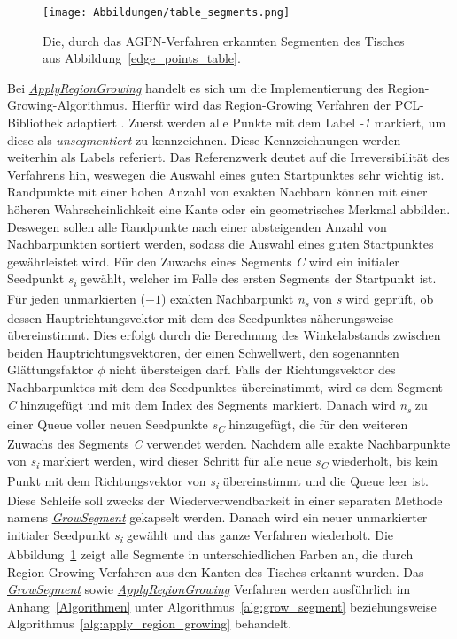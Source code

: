 \begin{figure}[t]
	\texttt{[image: Abbildungen/table\_segments.png]}
	\centering
	\caption[Segmente eines Tisches]{Die, durch das AGPN-Verfahren erkannten Segmenten des Tisches aus Abbildung~\ref{edge_points_table}.}
	\label{segments_table}
\end{figure}

Bei \textit{\hyperref[alg:apply_region_growing]{ApplyRegionGrowing}} handelt es sich um die Implementierung des Region-Growing-Algorithmus. Hierfür wird das Region-Growing Verfahren der PCL-Bibliothek adaptiert \autocite{rusu_3d_2011}. Zuerst werden alle Punkte mit dem Label \textit{-1} markiert, um diese als \textit{unsegmentiert} zu kennzeichnen. Diese Kennzeichnungen werden weiterhin als Labels referiert. Das Referenzwerk deutet auf die Irreversibilität des Verfahrens hin, weswegen die Auswahl eines guten Startpunktes sehr wichtig ist. Randpunkte mit einer hohen Anzahl von exakten Nachbarn können mit einer höheren Wahrscheinlichkeit eine Kante oder ein geometrisches Merkmal abbilden. Deswegen sollen alle Randpunkte nach einer absteigenden Anzahl von Nachbarpunkten sortiert werden, sodass die Auswahl eines guten Startpunktes gewährleistet wird. Für den Zuwachs eines Segments \textit{C} wird ein initialer Seedpunkt \textit{s\textsubscript{i}} gewählt, welcher im Falle des ersten Segments der Startpunkt ist. Für jeden unmarkierten ($-1$) exakten Nachbarpunkt \textit{n\textsubscript{s}} von \textit{s} wird geprüft, ob dessen Hauptrichtungsvektor mit dem des Seedpunktes näherungsweise übereinstimmt. Dies erfolgt durch die Berechnung des Winkelabstands zwischen beiden Hauptrichtungsvektoren, der einen Schwellwert, den sogenannten Glättungsfaktor $\phi$ nicht übersteigen darf. Falls der Richtungsvektor des Nachbarpunktes mit dem des Seedpunktes übereinstimmt, wird es dem Segment \textit{C} hinzugefügt und mit dem Index des Segments markiert. Danach wird \textit{n\textsubscript{s}} zu einer Queue voller neuen Seedpunkte \textit{s\textsubscript{C}} hinzugefügt, die für den weiteren Zuwachs des Segments \textit{C} verwendet werden. Nachdem alle exakte Nachbarpunkte von \textit{s\textsubscript{i}} markiert werden, wird dieser Schritt für alle neue \textit{s\textsubscript{C}} wiederholt, bis kein Punkt mit dem Richtungsvektor von \textit{s\textsubscript{i}} übereinstimmt und die Queue leer ist. Diese Schleife soll zwecks der Wiederverwendbarkeit in einer separaten Methode namens \textit{\hyperref[alg:grow_segment]{GrowSegment}} gekapselt werden. Danach wird ein neuer unmarkierter initialer Seedpunkt \textit{s\textsubscript{i}} gewählt und das ganze Verfahren wiederholt. Die Abbildung~\ref{segments_table} zeigt alle Segmente in unterschiedlichen Farben an, die durch Region-Growing Verfahren aus den Kanten des Tisches erkannt wurden. Das \textit{\hyperref[alg:grow_segment]{GrowSegment}} sowie \textit{\hyperref[alg:apply_region_growing]{ApplyRegionGrowing}} Verfahren werden ausführlich im Anhang~\ref{Algorithmen} unter Algorithmus~\ref{alg:grow_segment} beziehungsweise Algorithmus~\ref{alg:apply_region_growing} behandelt.

